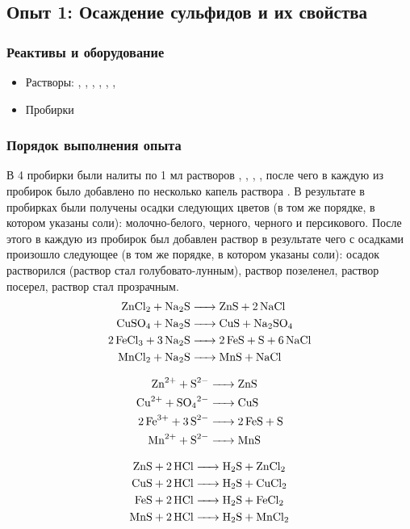 \documentclass[a4paper, 12pt]{article}
\begin{document}
\subsection{Опыт 1: Осаждение сульфидов и их свойства}

\subsubsection{Реактивы и оборудование}

\begin{itemize}
	\item Растворы: , , , , , , 
	
	\item Пробирки
\end{itemize}

\subsubsection{Порядок выполнения опыта}

В 4 пробирки были налиты по 1 мл растворов , , , , после чего в каждую из пробирок было добавлено по несколько капель раствора . В результате в пробирках были получены осадки следующих цветов (в том же порядке, в котором указаны соли): молочно-белого, черного, черного и персикового. После этого в каждую из пробирок был добавлен раствор  в результате чего с осадками произошло следующее  (в том же порядке, в котором указаны соли): осадок растворился (раствор стал голубовато-лунным), раствор позеленел, раствор посерел, раствор стал прозрачным.
\begin{align}
	\ce{ZnCl2 + Na2S &-> ZnS + 2 NaCl}\\
	\ce{CuSO4 + Na2S &-> CuS + Na2SO4}\\
	\ce{2FeCl3 + 3Na2S &-> 2 FeS + S + 6 NaCl}\\
	\ce{MnCl2 + Na2S &->  MnS + NaCl}
\end{align}

\begin{align}
	\ce{Zn^2+ + S^2- &-> ZnS}\\
	\ce{Cu^2+ + SO4^2- &-> CuS}\\
	\ce{2Fe^3+ + 3S^2- &-> 2FeS + S}\\
	\ce{Mn^2+ + S^2- &-> MnS}
\end{align}

\begin{align}
	\ce{ZnS + 2HCl &-> H2S + ZnCl2}\\
	\ce{CuS + 2HCl &-> H2S + CuCl2}\\
	\ce{FeS + 2HCl &-> H2S + FeCl2}\\
	\ce{MnS + 2HCl &-> H2S + MnCl2}
\end{align}
\end{document}
